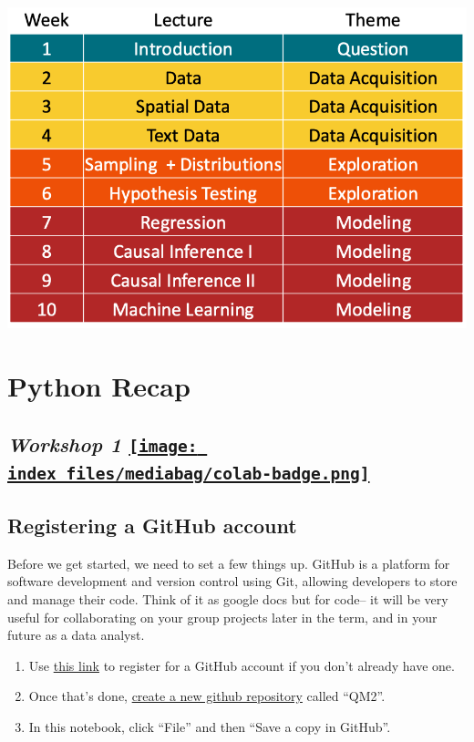 \documentclass[
  letterpaper,
  DIV=11,
  numbers=noendperiod]{scrreprt}
\providecommand{\tightlist}{%
  \setlength{\itemsep}{0pt}\setlength{\parskip}{0pt}}\usepackage{longtable,booktabs,array}
\begin{document}
\includegraphics{outline.png}


\hypertarget{python-recap}{%
\chapter{Python Recap}\label{python-recap}}

\hypertarget{workshop-1-open-in-colab}{%
\section[\emph{Workshop 1} ]{\texorpdfstring{\emph{Workshop 1}
\href{https://colab.research.google.com/github/oballinger/QM2/blob/main/notebooks/W01.\%20Python\%20Recap.ipynb}{\protect\texttt{[image: index\_files/mediabag/colab-badge.png]}}}{Workshop 1 Open In Colab}}\label{workshop-1-open-in-colab}}

\hypertarget{registering-a-github-account}{%
\section{Registering a GitHub
account}\label{registering-a-github-account}}

Before we get started, we need to set a few things up. GitHub is a
platform for software development and version control using Git,
allowing developers to store and manage their code. Think of it as
google docs but for code-- it will be very useful for collaborating on
your group projects later in the term, and in your future as a data
analyst.

\begin{enumerate}
\def\labelenumi{\arabic{enumi}.}
\tightlist
\item
  Use \href{https://github.com/join}{this link} to register for a GitHub
  account if you don't already have one.
\item
  Once that's done, \href{https://github.com/new}{create a new github
  repository} called ``QM2''.
\item
  In this notebook, click ``File'' and then ``Save a copy in GitHub''.
\end{enumerate}
\end{document}
